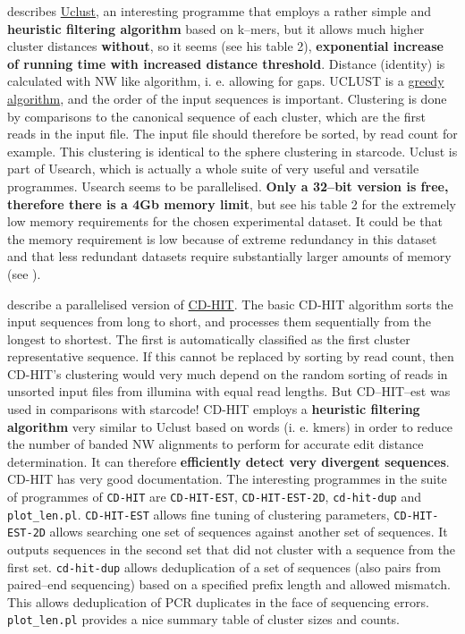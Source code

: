 \documentclass{article}\usepackage[]{graphicx}\usepackage[]{color}
\begin{document}
\cite{Edgar2010} describes \href{http://drive5.com/usearch/manual/uclust_algo.html}{Uclust}, an interesting programme that employs a rather simple and \textbf{heuristic filtering algorithm} based on k--mers, but it allows much higher cluster distances \textbf{without}, so it seems (see his table 2), \textbf{exponential increase of running time with increased distance threshold}. Distance (identity) is calculated with NW like algorithm, i. e. allowing for gaps. UCLUST is a \href{https://en.wikipedia.org/wiki/Greedy_algorithm}{greedy algorithm}, and the order of the input sequences is important. Clustering is done by comparisons to the canonical sequence of each cluster, which are the first reads in the input file. The input file should therefore be sorted, by read count for example. This clustering is identical to the sphere clustering in starcode. Uclust is part of Usearch, which is actually a whole suite of very useful and versatile programmes. Usearch seems to be parallelised. \textbf{Only a 32--bit version is free, therefore there is a 4Gb memory limit}, but see his table 2 for the extremely low memory requirements for the chosen experimental dataset. It could be that the memory requirement is low because of extreme redundancy in this dataset and that less redundant datasets require substantially larger amounts of memory (see \citealt[table 1]{Fu2012}).

\cite{Fu2012} describe a parallelised version of \href{http://weizhongli-lab.org/cd-hit/}{CD-HIT}. The basic CD-HIT algorithm sorts the input sequences from long to short, and processes them sequentially from the longest to shortest. The first is automatically classified as the first cluster representative sequence. If this cannot be replaced by sorting by read count, then CD-HIT's clustering would very much depend on the random sorting of reads in unsorted input files from illumina with equal read lengths. But CD--HIT--est was used in comparisons with starcode! CD-HIT employs a \textbf{heuristic filtering algorithm} very similar to Uclust based on words (i. e. kmers) in order to reduce the number of banded NW alignments to perform for accurate edit distance determination. It can therefore \textbf{efficiently detect very divergent sequences}. CD-HIT has very good documentation. The interesting programmes in the suite of programmes of \texttt{CD-HIT} are \texttt{CD-HIT-EST}, \texttt{CD-HIT-EST-2D}, \texttt{cd-hit-dup} and \texttt{plot\_len.pl}. \texttt{CD-HIT-EST} allows fine tuning of clustering parameters, \texttt{CD-HIT-EST-2D} allows searching one set of sequences against another set of sequences. It outputs sequences in the second set that did not cluster with a sequence from the first set. \texttt{cd-hit-dup} allows deduplication of a set of sequences (also pairs from paired--end sequencing) based on a specified prefix length and allowed mismatch. This allows deduplication of PCR duplicates in the face of sequencing errors. \texttt{plot\_len.pl} provides a nice summary table of cluster sizes and counts.
\end{document}
